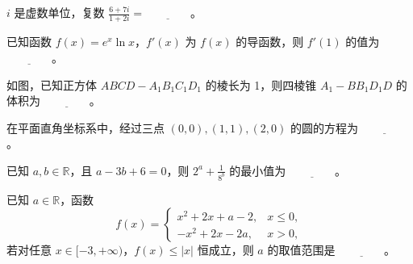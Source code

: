 \begin{question}
$i$ 是虚数单位，复数 $\frac{6+7i}{1+2i}=\underline{\qquad\qquad}$。

\end{question}
\begin{question}
已知函数 $f(x)=e^x\ln x$，$f'(x)$ 为 $f(x)$ 的导函数，则 $f'(1)$ 的值为 $\underline{\qquad\qquad}$。

\Needspace{0.4\textheight}
\end{question}
\begin{question}
如图，已知正方体 $ABCD-A_1B_1C_1D_1$ 的棱长为 1，则四棱锥 $A_1-BB_1D_1D$ 的体积为 $\underline{\qquad\qquad}$。
\nopagebreak[4]
\begin{center}\end{center}
\nopagebreak[4]
\end{question}
\begin{question}
在平面直角坐标系中，经过三点 $(0,0),(1,1),(2,0)$ 的圆的方程为 $\underline{\qquad\qquad}$。

\end{question}
\begin{question}
已知 $a,b\in\mathbb R$，且 $a-3b+6=0$，则 $2^a+\frac1{8^b}$ 的最小值为 $\underline{\qquad\qquad}$。

\end{question}
\begin{question}
已知 $a\in\mathbb R$，函数
\nopagebreak[4]
\[
f(x)=\begin{cases}
x^2+2x+a-2,&x\leqslant0,\\
-x^2+2x-2a,&x>0,
\end{cases}
\]
若对任意 $x\in[-3,+\infty)$，$f(x)\leqslant|x|$ 恒成立，则 $a$ 的取值范围是 $\underline{\qquad\qquad}$。

\end{question}

